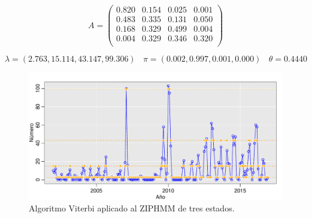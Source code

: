 \documentclass[a4paper]{article}\usepackage[]{graphicx}\usepackage[]{color}
\makeatletter
\def\maxwidth{ %
  \ifdim\Gin@nat@width>\linewidth
    \linewidth
  \else
    \Gin@nat@width
  \fi
}
\newenvironment{knitrout}{}{} %
\makeatother
\begin{document}
$$
A = \begin{pmatrix}{}
  0.820 & 0.154 & 0.025 & 0.001 \\ 
  0.483 & 0.335 & 0.131 & 0.050 \\ 
  0.168 & 0.329 & 0.499 & 0.004 \\ 
  0.004 & 0.329 & 0.346 & 0.320 \\ 
  \end{pmatrix}
$$

$$\lambda = (2.763, 15.114, 43.147, 99.306) \ \ \ \ \pi = (0.002, 0.997, 0.001, 0.000) \ \ \ \ \theta = 0.4440 $$



\begin{table}[ht]
\centering
{}
\caption{Resultados de la decodificación global con el algoritmo Viterbi, para el ZIP HMM.} 
\end{table}


\begin{knitrout}
\color{fgcolor}\begin{figure}
\includegraphics[width=\maxwidth]{figure/unnamed-chunk-45-1} \caption[Algoritmo Viterbi aplicado al ZIPHMM de tres estados]{Algoritmo Viterbi aplicado al ZIPHMM de tres estados.}\label{fig:unnamed-chunk-45}
\end{figure}


\end{knitrout}
\end{document}
